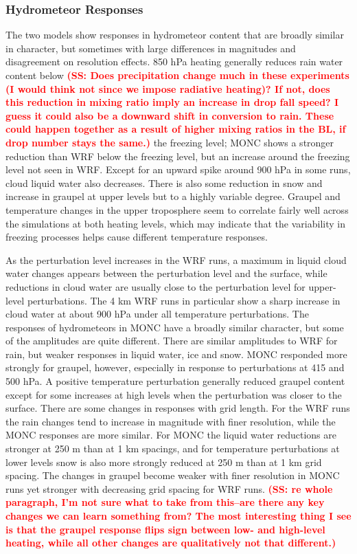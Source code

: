 \documentclass[draft]{agujournal2019}
\newcommand{\todo}[1]{\textcolor{red}{\textbf{(#1)}}}
\begin{document}
\subsubsection{Hydrometeor Responses}

The two models show responses in hydrometeor content that are broadly similar in
character, but sometimes with large differences in
magnitudes and disagreement on resolution effects.
850 hPa heating generally
reduces rain water content below \todo{SS: Does precipitation change much in these experiments (I would think not since we impose radiative heating)?  If not, does this reduction in mixing ratio imply an increase in drop fall speed?  I guess it could also be a downward shift in conversion to rain.  These could happen together as a result of higher mixing ratios in the BL, if drop number stays the same.} the freezing level; MONC shows a stronger reduction than
WRF below the freezing level, but an increase around the freezing level not seen in WRF. Except for an upward spike around 900 hPa in some runs, cloud liquid water also decreases. There is also some reduction in snow and increase in graupel
at upper levels but to a highly variable degree. Graupel and temperature changes in the upper troposphere seem to correlate fairly well across the simulations at both heating levels, which may indicate that the variability in freezing processes helps cause different temperature responses.

As the perturbation level increases in the WRF runs, a maximum in liquid cloud
water changes appears between the perturbation level and the surface, while
reductions in cloud water are usually close to the perturbation level for
upper-level perturbations. The 4 km WRF runs in particular show a sharp increase
in cloud water at about 900 hPa under all temperature perturbations. The
responses of hydrometeors in MONC have a broadly similar character, but some of
the amplitudes are quite different. There are similar amplitudes to WRF for
rain, but weaker responses in liquid water, ice and snow. MONC responded more
strongly for graupel, however, especially in response to perturbations at 415
and 500 hPa. A positive temperature perturbation generally reduced graupel
content except for some increases at high levels when the perturbation was
closer to the surface. There are some changes in responses with grid length. For
the WRF runs the rain changes tend to increase in magnitude with finer
resolution, while the MONC responses are more similar. For MONC the liquid water
reductions are stronger at 250 m than at 1 km spacings, and for temperature
perturbations at lower levels snow is also more strongly reduced at 250 m than
at 1 km grid spacing. The changes in graupel become weaker with finer resolution
in MONC runs yet stronger with decreasing grid spacing for WRF runs. \todo{SS: re whole paragraph, I'm not sure what to take from this--are there any key changes we can learn something from?  The most interesting thing I see is that the graupel response flips sign between low- and high-level heating, while all other changes are qualitatively not that different.} 
\end{document}
